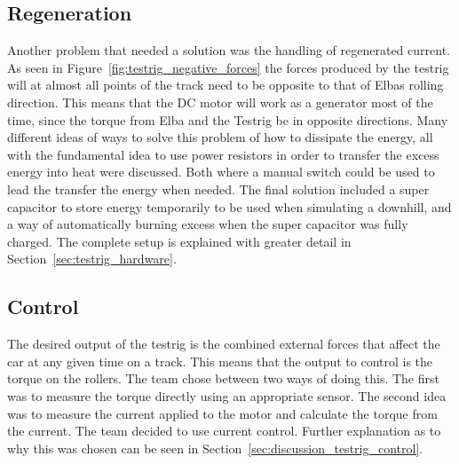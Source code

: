 \subsection{Regeneration}
Another problem that needed a solution was the handling of regenerated current. As seen in
Figure~\ref{fig:testrig_negative_forces} the forces produced by the testrig will at almost
all points of the track need to be opposite to that of Elbas rolling direction. This means
that the DC motor will work as a generator most of the time, since the torque from Elba
and the Testrig be in opposite directions. Many different ideas of ways to solve this
problem of how to dissipate the energy, all with the fundamental idea to use power
resistors in order to transfer the excess energy into heat were discussed. Both where a
manual switch could be used to lead the transfer the energy when needed. The final
solution included a super capacitor to store energy temporarily to be used when simulating
a downhill, and a way of automatically burning excess when the super capacitor was fully
charged. The complete setup is explained with greater detail in
Section~\ref{sec:testrig_hardware}.

\subsection{Control}\label{sec:testrig_design_control}
The desired output of the testrig is the combined external forces that affect the car at
any given time on a track. This means that the output to control is the torque on the
rollers. The team chose between two ways of doing this. The first was to measure the
torque directly using an appropriate sensor. The second idea was to measure the current
applied to the motor and calculate the torque from the current. 
The team decided to use current control. Further explanation as to why this was chosen can
be seen in Section~\ref{sec:discussion_testrig_control}.

